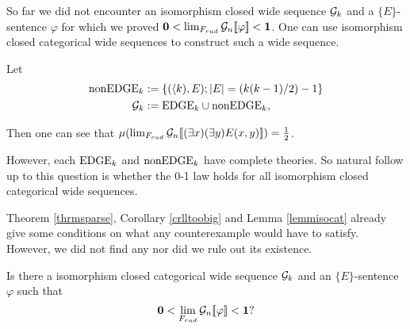 So far we did not encounter an isomorphism closed wide sequence $\mathcal{G}_k$ and a $\{E\}$-sentence $\varphi$ for which we proved $\textbf{0}<\lim_{F_{rud}}\mathcal{G}_n[\![\varphi]\!]<\textbf{1}$. One can use isomorphism closed categorical wide sequences to construct such a wide sequence.
\begin{exam}
Let
\begin{align}
\text{nonEDGE}_k&:=\{(\langle k),E);\left|{E}\right|=(k(k-1)/2)-1\}\\
\mathcal{G}_k&:=\text{EDGE}_k\cup\text{nonEDGE}_k,
\end{align}

Then one can see that $\mu(\lim_{F_{rud}}\mathcal{G}_n[\![(\exists x)(\exists y)E(x,y)]\!])=\frac{1}{2}$.
\end{exam}

However, each $\text{EDGE}_k$ and $\text{nonEDGE}_k$ have complete theories. So natural follow up to this question is whether the 0-1 law holds for all isomorphism closed categorical wide sequences. 

Theorem \ref{thrmsparse}, Corollary \ref{crlltoobig} and Lemma \ref{lemmisocat} already give some conditions on what any counterexample would have to satisfy. However, we did not find any nor did we rule out its existence. 

\begin{ques}
Is there a isomorphism closed categorical wide sequence $\mathcal{G}_k$ and an $\{E\}$-sentence $\varphi$ such that
\[\textbf{0}<\lim_{F_{rud}}\mathcal{G}_n[\![\varphi]\!]<\textbf{1}?\]
\end{ques}
